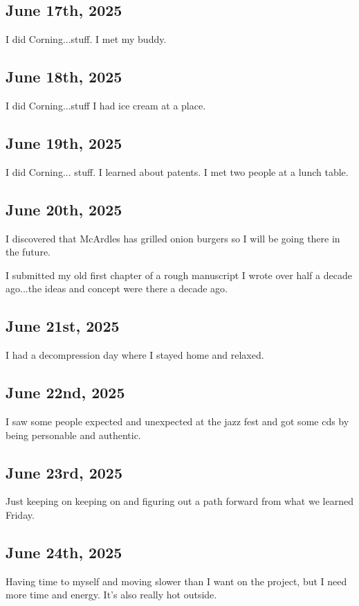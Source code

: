 \documentclass{article}
\begin{document}
\subsection{June 17th, 2025}
I did Corning...stuff. 
I met my buddy. 


\subsection{June 18th, 2025}
I did Corning...stuff
I had ice cream at a place. 


\subsection{June 19th, 2025}
I did Corning... stuff.
I learned about patents. 
I met two people at a lunch table. 

\subsection{June 20th, 2025}
I discovered that McArdles has grilled onion burgers so I will be going there in the future. 

I submitted my old first chapter of a rough manuscript I wrote over half a decade ago...the ideas and concept were there a decade ago.

\subsection{June 21st, 2025}
I had a decompression day where I stayed home and relaxed. 

\subsection{June 22nd, 2025}
I saw some people expected and unexpected at the jazz fest and got some cds by being personable and authentic. 

\subsection{June 23rd, 2025}
Just keeping on keeping on and figuring out a path forward from what we learned Friday. 

\subsection{June 24th, 2025}
Having time to myself and moving slower than I want on the project, but I need more time and energy. It's also really hot outside.
\end{document}
